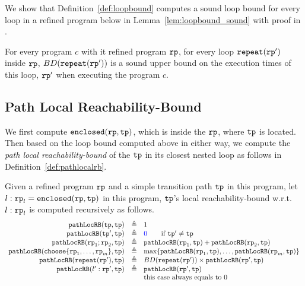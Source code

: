 We show that Definition~\ref{def:loopbound} computes a sound loop bound for every loop in a refined program below in Lemma~\ref{lem:loopbound_sound} with proof in .
\begin{lem}
  \label{lem:loopbound_sound}
  For every program $c$ with it refined program $\mathtt{rp}$,
  for every loop $\mathtt{repeat}(\mathtt{rp}')$ inside $\mathtt{rp}$, 
  $BD(\mathtt{repeat}(\mathtt{rp}'))$ is a sound upper bound on the execution times of this loop, $\mathtt{rp}'$ when executing the program $c$.
\end{lem}


\subsection{Path Local Reachability-Bound}
We first compute $\mathtt{enclosed}(\mathtt{rp}, \mathtt{tp})$, which is  inside the $\mathtt{rp}$, where $\mathtt{tp}$ is located.
\\
Then based on the loop bound computed above in either way, we compute the \emph{path local reachability-bound} of
the $\mathtt{tp}$ in its closest nested loop as follows in Definition~\ref{def:pathlocalrb}.
\begin{defn}
    \label{def:pathlocalrb}
    Given a refined program $\mathtt{rp}$ and a simple transition path $\mathtt{tp}$ in this program, 
    let $l: \mathtt{rp}_l = \mathtt{enclosed}(\mathtt{rp}, \mathtt{tp})$ in this program,
    $\mathtt{tp}$'s local reachability-bound w.r.t. $l: \mathtt{rp}_l$
    is computed recursively as follows. 
  \[
    \begin{array}{rcl}
      \outinB(\tpath, \tpath) & \triangleq & 1 \\
      \outinB(\tpath', \tpath) & \triangleq & \highlight{0} \qquad \text{if } \tpath' \neq \tpath\\
      \outinB(\rprog_1;\rprog_2, \tpath) & \triangleq & \outinB(\rprog_1, \tpath) + \outinB(\rprog_2, \tpath) \\
      \outinB(\rpchoose{\rprog_1, \ldots, \rprog_m }, \tpath) & \triangleq 
      & \max\left\{ \outinB(\rprog_1, \tpath), \ldots, \outinB(\rprog_m, \tpath) \right\} \\
      \outinB(\rprepeat(\rprog'), \tpath) & \triangleq 
      & BD(\rprepeat(\rprog'))
       \times \outinB(\rprog', \tpath)
       \\
      \outinB(l': \rprog', \tpath) & \triangleq & \outinB(\rprog', \tpath) \\
      &  & \text{this case always equals to } 0 \\
    \end{array}
    \]
\end{defn}

